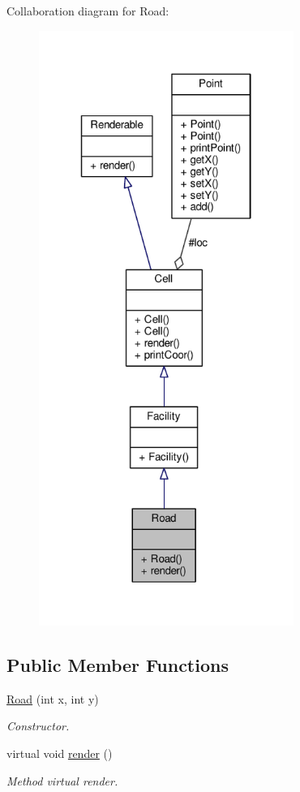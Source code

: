 Collaboration diagram for Road\+:
\nopagebreak
\begin{figure}[H]
\begin{center}
\leavevmode
\includegraphics[height=550pt]{classRoad__coll__graph}
\end{center}
\end{figure}
\subsection*{Public Member Functions}
\begin{DoxyCompactItemize}
\item 
\hyperlink{classRoad_adf96d914718db461bddfbc5e5a0312cc}{Road} (int x, int y)
\begin{DoxyCompactList}\small\item\em Constructor. \end{DoxyCompactList}\item 
virtual void \hyperlink{classRoad_a4a031caf04affb2713ff55b10e8164ae}{render} ()\hypertarget{classRoad_a4a031caf04affb2713ff55b10e8164ae}{}\label{classRoad_a4a031caf04affb2713ff55b10e8164ae}

\begin{DoxyCompactList}\small\item\em Method virtual render. \end{DoxyCompactList}\end{DoxyCompactItemize}
